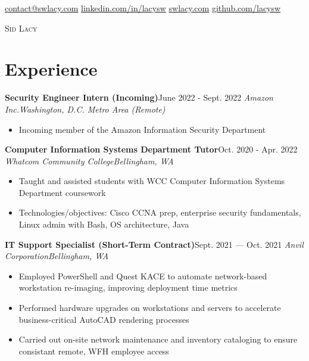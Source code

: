\documentclass{article}
\newcommand{\alignicon}[2][nmbr]{\eqmakebox[#1]{\strut #2}}
\newcommand{\topLevelItem}[4]{
    \textbf{#1}\hfill #4\newline
    \emph{#2\hfill #3}\newline
    \vspace{-18pt}\begin{itemize}
}
\newcommand{\topLevelItemEnd}{\end{itemize}\vspace{5pt}}
\newcommand{\lowLevelItem}[1]{
    \item\small{#1}\vspace{-8pt}
}
\begin{document}
    \begin{center}
        \noindent\alignicon\faEnvelope\quad\href{mailto:contact@swlacy.com}{contact@swlacy.com}\hfill %
        \href{https://linkedin.com/in/lacysw}{linkedin.com/in/lacysw}\quad\alignicon\faLinkedin\newline %
        \alignicon\faGlobe\quad\href{https://swlacy.com}{swlacy.com}\hfill %
        \href{https://github.com/lacysw}{github.com/lacysw}\quad\alignicon\faGithub\vspace*{-0.33in} %
        
        {\fontsize{28}{0}\selectfont\scshape Sid Lacy}\vspace{5pt}
    \end{center}
    
    \section*{Experience}
        \topLevelItem{Security Engineer Intern (Incoming)}{Amazon Inc.}{Washington, D.C. Metro Area (Remote)}{June 2022 - Sept. 2022}
            \lowLevelItem{Incoming member of the Amazon Information Security Department}
        \topLevelItemEnd
        \topLevelItem{Computer Information Systems Department Tutor}{Whatcom Community College}{Bellingham, WA}{Oct. 2020 - Apr. 2022}
            \lowLevelItem{Taught and assisted students with WCC Computer Information Systems Department coursework}
            \lowLevelItem{Technologies/objectives: Cisco CCNA prep, enterprise security fundamentals, Linux admin with Bash, OS architecture, Java}
        \topLevelItemEnd
        \topLevelItem{IT Support Specialist (Short-Term Contract)}{Anvil Corporation}{Bellingham, WA}{Sept. 2021 — Oct. 2021}
            \lowLevelItem{Employed PowerShell and Quest KACE to automate network-based workstation re-imaging, improving deployment time metrics}
            \lowLevelItem{Performed hardware upgrades on workstations and servers to accelerate business-critical AutoCAD rendering processes}
            \lowLevelItem{Carried out on-site network maintenance and inventory cataloging to ensure consistant remote, WFH employee access}
        \topLevelItemEnd
        
\end{document}
